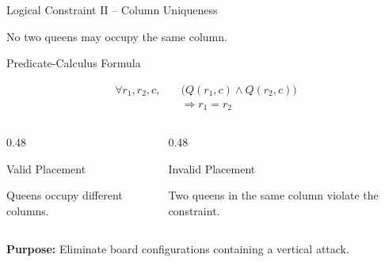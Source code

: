 \documentclass[aspectratio=169,12pt]{beamer}
\begin{document}

\begin{frame}{Logical Constraint II -- Column Uniqueness}

No two queens may occupy the same column.

\begin{block}{Predicate-Calculus Formula}

\[
\begin{aligned}
\forall r_1,r_2,c,\quad
&\big(Q(r_1,c)\land Q(r_2,c)\big)\\
&\Rightarrow r_1=r_2
\end{aligned}
\]

\end{block}

\begin{columns}[T,totalwidth=\textwidth]

\begin{column}{0.48\textwidth}

\begin{exampleblock}{Valid Placement}

Queens occupy different columns.
\end{exampleblock}

\end{column}

\begin{column}{0.48\textwidth}

\begin{alertblock}{Invalid Placement}

Two queens in the same column violate the constraint.
\end{alertblock}

\end{column}

\end{columns}

\textbf{Purpose:} Eliminate board configurations containing
a vertical attack.

\end{frame}

\end{document}
